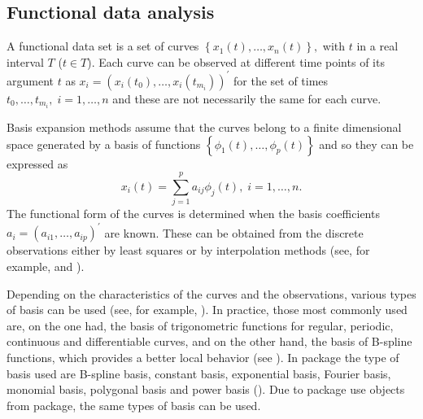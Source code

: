\subsection{Functional data analysis}

A functional data set is a set of curves $ \left\{ x_1(t),\ldots, x_n (t) \right\}, $ with $t$ in a real interval $T$ ($ t \in T$). Each curve can be observed at different time points of its argument $t$ as $x_{i}=\left( x_{i}\left( t_{0}\right),\ldots ,x_{i}\left(t_{m_{i}}\right) \right)^{\prime}$ for the set of times $t_{0},\ldots,t_{m_{i}},\;i=1,\ldots ,n$ and these are not necessarily the same for each curve.

Basis expansion methods assume that the curves belong to a finite dimensional space generated by a basis of functions $\left\{ \phi _{1}\left( t\right) ,\ldots ,\phi_{p}\left( t\right) \right\} $ and so they can be expressed as 
\begin{equation}
x_{i}\left( t\right) =\sum_{j=1}^{p}a_{ij}\phi _{j}\left( t\right), \;
i=1,\ldots,n.
\label{BasisExpan}
\end{equation}
The functional form of the curves is determined when the basis coefficients $a_i=\left(a_{i1},\ldots,a_{ip}\right)^{\prime}$ are known. These can be obtained from the discrete observations either by least squares or by interpolation methods (see, for example, \cite{Escabias200595} and \cite{Escabias2006}).

Depending on the characteristics of the curves and the observations, various types of basis can be used (see, for example, \cite{Ramsay05}). In practice, those most commonly used are, on the one had, the basis of trigonometric functions for regular, periodic, continuous and differentiable curves, and on the other hand, the basis of B-spline functions, which provides a better local behavior (see \cite{DeBoor2001}). In  package the type of basis used are B-spline basis, constant basis, exponential basis, Fourier basis, monomial basis, polygonal basis and power basis (\cite{Ramsay09}). Due to  package use  objects from  package, the same types of basis can be used.

